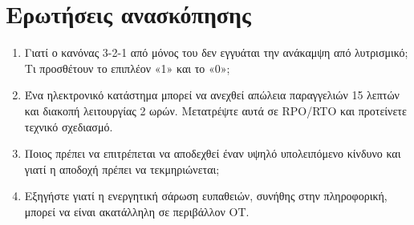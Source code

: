 \documentclass[11pt,openany]{book}
\begin{document}
\section*{Ερωτήσεις ανασκόπησης}
\begin{enumerate}
  \item Γιατί ο κανόνας 3-2-1 από μόνος του δεν εγγυάται την ανάκαμψη από λυτρισμικό; Τι προσθέτουν το επιπλέον «1» και το «0»;
  \item Ένα ηλεκτρονικό κατάστημα μπορεί να ανεχθεί απώλεια παραγγελιών 15 λεπτών και διακοπή λειτουργίας 2 ωρών. Μετατρέψτε αυτά σε RPO/RTO και προτείνετε τεχνικό σχεδιασμό.
  \item Ποιος πρέπει να επιτρέπεται να αποδεχθεί έναν υψηλό υπολειπόμενο κίνδυνο και γιατί η αποδοχή πρέπει να τεκμηριώνεται;
  \item Εξηγήστε γιατί η ενεργητική σάρωση ευπαθειών, συνήθης στην πληροφορική, μπορεί να είναι ακατάλληλη σε περιβάλλον OT.
\end{enumerate}
\end{document}
